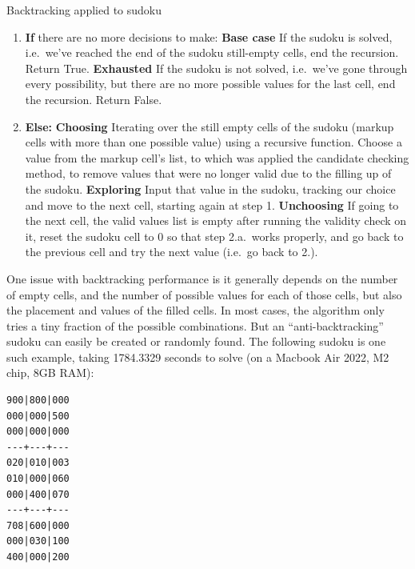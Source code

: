 \documentclass[12pt]{report} %
\begin{document}
\begin{examplebox}{Backtracking applied to sudoku}

    \begin{enumerate}
      \item \textbf{If} there are no more decisions to make:
      \textbf{Base case} If the sudoku is solved, i.e.\ we've reached the end of the sudoku still-empty cells, end the recursion. Return True.
      \textbf{Exhausted} If the sudoku is not solved, i.e.\ we've gone through every possibility, but there are no more possible values for the last cell, end the recursion. Return False.
      \item \textbf{Else:}
       \textbf{Choosing} Iterating over the still empty cells of the sudoku (markup cells with more than one possible value) using a recursive function. Choose a value from the markup cell's list, to which was applied the candidate checking method, to remove values that were no longer valid due to the filling up of the sudoku.
       \textbf{Exploring} Input that value in the sudoku, tracking our choice and move to the next cell, starting again at step 1.
       \textbf{Unchoosing} If going to the next cell, the valid values list is empty after running the validity check on it, reset the sudoku cell to 0 so that step 2.a.\ works properly, and go back to the previous cell and try the next value (i.e.\ go back to 2.).

    \end{enumerate}

\end{examplebox}


One issue with backtracking performance is it generally depends on the number of empty cells, and the number of possible values for each of those cells, but also the placement and values of the filled cells. In most cases, the algorithm only tries a tiny fraction of the possible combinations. But an ``anti-backtracking'' sudoku can easily be created or randomly found. The following sudoku is one such example, taking 1784.3329 seconds to solve\cite{stackoverflow_optimizing_backtracking_sudoku} (on a Macbook Air 2022, M2 chip, 8GB RAM):

\begin{lstlisting}[caption={anti\_backtracking.txt sudoku}]
900|800|000
000|000|500
000|000|000
---+---+---
020|010|003
010|000|060
000|400|070
---+---+---
708|600|000
000|030|100
400|000|200
\end{lstlisting}
\end{document}
